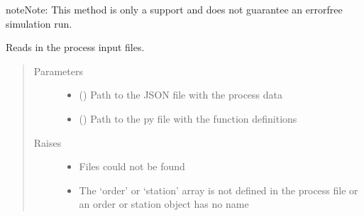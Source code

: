 \documentclass[letterpaper,10pt,english]{sphinxmanual}
\begin{document}
\begin{fulllineitems}
\begin{fulllineitems}
\begin{quote}
\begin{description}
\end{description}\end{quote}

\begin{sphinxadmonition}{note}{Note:}
\sphinxAtStartPar
This method is only a support and does not guarantee an error\sphinxhyphen{}free simulation run.
\end{sphinxadmonition}

\end{fulllineitems}


\begin{fulllineitems}
\label{\detokenize{source/API/api:environment.Environment.read_files}}
\sphinxAtStartPar
Reads in the process input files.
\begin{quote}\begin{description}
\item[{Parameters}] \leavevmode\begin{itemize}
\item {} 
\sphinxAtStartPar
{} () \textendash{} Path to the JSON file with the process data

\item {} 
\sphinxAtStartPar
{} () \textendash{} Path to the py file with the function definitions

\end{itemize}

\item[{Raises}] \leavevmode\begin{itemize}
\item {} 
\sphinxAtStartPar
{} \textendash{} Files could not be found

\item {} 
\sphinxAtStartPar
{} \textendash{} The ‘order’ or ‘station’ array is not defined in the process file or an order or
station object has no name


\end{itemize}
\end{description}
\end{quote}
\end{fulllineitems}
\end{fulllineitems}
\end{document}
